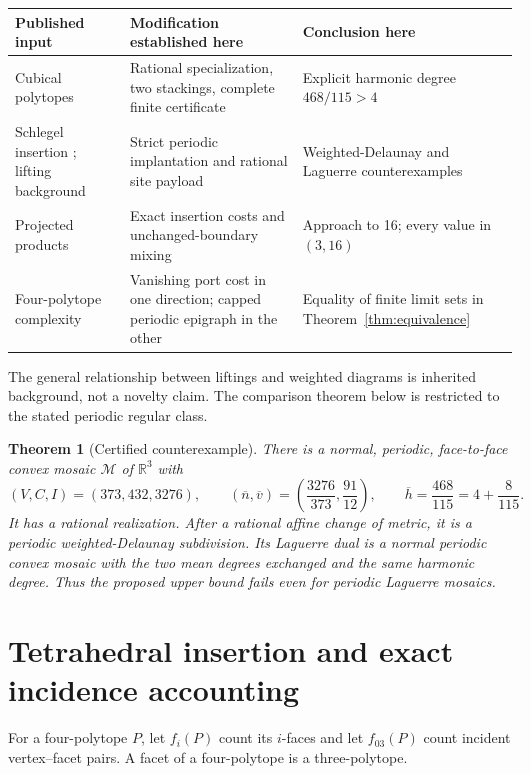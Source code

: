 \documentclass[11pt,a4paper]{article}
\newtheorem{theorem}{Theorem}[section]
\theoremstyle{definition}\newtheorem{definition}[theorem]{Definition}
\theoremstyle{remark}\newtheorem{remark}[theorem]{Remark}
\newcommand{\R}{\mathbb R}\newcommand{\Z}{\mathbb Z}\newcommand{\conv}{\operatorname{conv}}
\newcommand{\hbarM}{\overline h}\newcommand{\nbar}{\overline n}\newcommand{\vbar}{\overline v}
\begin{document}
\begin{center}\small
\begin{tabular}{p{}p{}p{}}
\toprule Published input & Modification established here & Conclusion here\\\midrule
Cubical polytopes \citep{JZ} & Rational specialization, two stackings, complete finite certificate & Explicit harmonic degree $468/115>4$\\
Schlegel insertion \citep{Z02}; lifting background \citep{R99} & Strict periodic implantation and rational site payload & Weighted-Delaunay and Laguerre counterexamples\\
Projected products \citep{Z04} & Exact insertion costs and unchanged-boundary mixing & Approach to 16; every value in $(3,16)$\\
Four-polytope complexity \citep{Z02} & Vanishing port cost in one direction; capped periodic epigraph in the other & Equality of finite limit sets in Theorem~\ref{thm:equivalence}\\
\bottomrule
\end{tabular}\end{center}
The general relationship between liftings and weighted diagrams is inherited background, not a novelty claim. The comparison theorem below is restricted to the stated periodic regular class.

\begin{theorem}[Certified counterexample]\label{thm:main}
There is a normal, periodic, face-to-face convex mosaic \(\mathcal M\) of \(\R^3\) with
\[
 (V,C,I)=(373,432,3276),\qquad
 (\nbar,\vbar)=\left(\frac{3276}{373},\frac{91}{12}\right),
 \qquad \hbarM=\frac{468}{115}=4+\frac8{115}.
\]
It has a rational realization. After a rational affine change of metric, it is a periodic weighted-Delaunay subdivision. Its Laguerre dual is a normal periodic convex mosaic with the two mean degrees exchanged and the same harmonic degree. Thus the proposed upper bound fails even for periodic Laguerre mosaics.
\end{theorem}

\section{Tetrahedral insertion and exact incidence accounting}
For a four-polytope \(P\), let \(f_i(P)\) count its \(i\)-faces and let \(f_{03}(P)\) count incident vertex--facet pairs. A facet of a four-polytope is a three-polytope.
\end{document}
